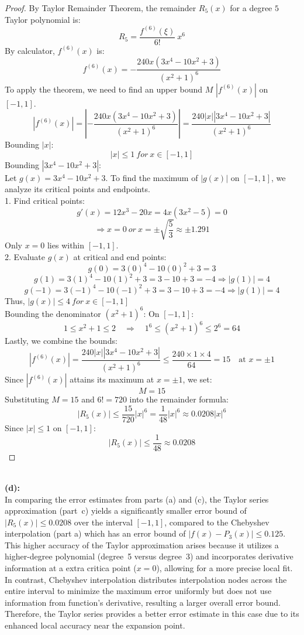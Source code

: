 \documentclass{article}
\begin{document}
\begin{proof}
By Taylor Remainder Theorem, the remainder $R_{5}(x)$ for a degree $5$ Taylor polynomial is:
\[ R_5 = \frac{f^{(6)}(\xi)}{6!} \ x^6 \]
By calculator, $f^{(6)}(x)$ is:
\[ f^{(6)}(x) = -\frac{240x(3x^4 -10x^2 + 3)}{(x^2 + 1)^6} \]
To apply the theorem, we need to find an upper bound $M$ $|f^{(6)}(x)|$ on $[-1, 1]$.
\[ |f^{(6)}(x)| = \left|-\frac{240x(3x^4 -10x^2 + 3)}{(x^2 + 1)^6} \right| = \frac{240|x||3x^4 -10x^2 + 3|}{(x^2 + 1)^6} \]
Bounding $|x|$: 
\[ |x| \leq 1 \ for \ x \in [-1, 1] \]
Bounding $|3x^4 -10x^2 + 3|$: 
\\
Let $g(x) = 3x^4 - 10x^2 + 3$. To find the maximum of $|g(x)|$ on $[-1,1]$, we analyze its critical points and endpoints.
\\
1. Find critical points:
\[ g'(x) = 12x^3 - 20x = 4x(3x^2 - 5) = 0 \]
\[ \Rightarrow x = 0 \ or \ x = \pm \sqrt{\frac{5}{3}} \approx \pm 1.291 \]
Only $x = 0$ lies within $[-1, 1]$.
\\
2. Evaluate $g(x)$ at critical and end points:
\[ g(0) = 3(0)^4 - 10(0)^2 + 3 = 3 \]
\[ g(1) = 3(1)^4 - 10(1)^2 + 3 = 3 - 10 + 3 = -4 \Rightarrow |g(1)| = 4 \]
\[ g(-1) = 3(-1)^4 - 10(-1)^2 + 3 = 3 - 10 + 3 = -4 \Rightarrow |g(1)| = 4 \]
Thus, \( |g(x)| \leq 4 \ for \ x \in [-1, 1] \)
\\
Bounding the denominator $(x^2 + 1)^6$:
On \([-1,1]\):
\[
1 \leq x^2 + 1 \leq 2 \quad \Rightarrow \quad 1^6 \leq (x^2 + 1)^6 \leq 2^6 = 64
\]
Lastly, we combine the bounds:
\[
|f^{(6)}(x)| = \frac{240|x||3x^4 -10x^2 + 3|}{(x^2 + 1)^6} \leq \frac{240 \times 1 \times 4}{64} = 15 \quad \text{at } x = \pm1
\]
Since \( |f^{(6)}(x)| \) attains its maximum at \( x = \pm1 \), we set:
\[
M = 15
\]
Substituting \( M = 15 \) and \( 6! = 720 \) into the remainder formula:
\[
|R_5(x)| \leq \frac{15}{720} |x|^6 = \frac{1}{48} |x|^6 \approx 0.0208 |x|^6
\]
Since \( |x| \leq 1 \) on \([-1,1]\):
\[
    |R_5(x)| \leq \frac{1}{48} \approx 0.0208
\]
\end{proof}
\\
\textbf{(d): }
\\
In comparing the error estimates from parts (a) and (c), the Taylor series approximation (part~c) yields a significantly smaller error bound of \( |R_5(x)| \leq 0.0208 \) over the interval \([-1, 1]\), 
compared to the Chebyshev interpolation (part a) which has an error bound of \( |f(x) - P_3(x)| \leq 0.125 \). 
This higher accuracy of the Taylor approximation arises because it utilizes a higher-degree polynomial (degree~5 versus degree~3) and incorporates derivative information at a extra critica point (\(x=0\)), allowing for a more precise local fit. 
In contrast, Chebyshev interpolation distributes interpolation nodes across the entire interval to minimize the maximum error uniformly but does not use information from function's derivative, resulting a larger overall error bound. 
Therefore, the Taylor series provides a better error estimate in this case due to its enhanced local accuracy near the expansion point.
\end{document}

